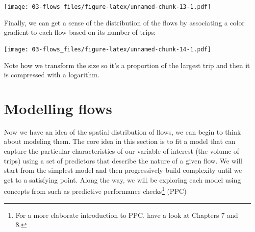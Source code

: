 \documentclass[]{book}
\newenvironment{Shaded}{\begin{snugshade}}{\end{snugshade}}
\newcommand{\KeywordTok}[1]{\textcolor[rgb]{0.13,0.29,0.53}{\textbf{#1}}}
\newcommand{\DataTypeTok}[1]{\textcolor[rgb]{0.13,0.29,0.53}{#1}}
\newcommand{\FloatTok}[1]{\textcolor[rgb]{0.00,0.00,0.81}{#1}}
\newcommand{\StringTok}[1]{\textcolor[rgb]{0.31,0.60,0.02}{#1}}
\newcommand{\OperatorTok}[1]{\textcolor[rgb]{0.81,0.36,0.00}{\textbf{#1}}}
\newcommand{\NormalTok}[1]{#1}
\begin{document}
\texttt{[image: 03-flows\_files/figure-latex/unnamed-chunk-13-1.pdf]}

Finally, we can get a sense of the distribution of the flows by
associating a color gradient to each flow based on its number of trips:

\begin{Shaded}
\end{Shaded}

\texttt{[image: 03-flows\_files/figure-latex/unnamed-chunk-14-1.pdf]}

Note how we transform the size so it's a proportion of the largest trip
and then it is compressed with a logarithm.

\section{Modelling flows}\label{modelling-flows}

Now we have an idea of the spatial distribution of flows, we can begin
to think about modeling them. The core idea in this section is to fit a
model that can capture the particular characteristics of our variable of
interest (the volume of trips) using a set of predictors that describe
the nature of a given flow. We will start from the simplest model and
then progressively build complexity until we get to a satisfying point.
Along the way, we will be exploring each model using concepts from
\citet{gelman2006data} such as predictive performance checks\footnote{For
  a more elaborate introduction to PPC, have a look at Chapters 7 and 8.}
(PPC)
\end{document}
